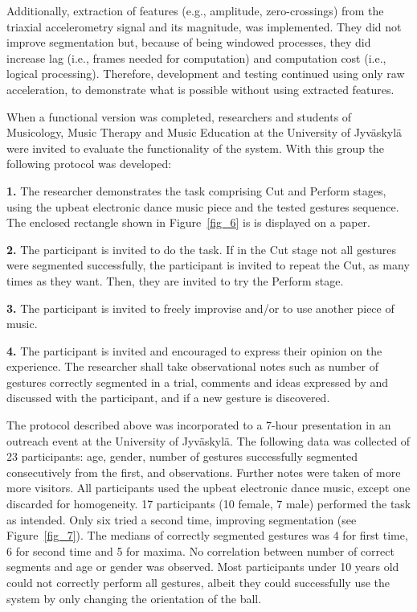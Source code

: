 \documentclass{nime-alternate_ADJ} %
\begin{document}
Additionally, extraction of features (e.g., amplitude, zero-crossings) from the triaxial accelerometry signal and its magnitude, was implemented. They did not improve segmentation but, because of being windowed processes, they did increase lag (i.e., frames needed for computation) and computation cost (i.e., logical processing). Therefore, development and testing continued using only raw acceleration, to demonstrate what is possible without using extracted features. 

When a functional version was completed, researchers and students of Musicology, Music Therapy and Music Education at the 
University of Jyväskylä
were invited to evaluate the functionality of the system. With this group the following protocol was developed:

\textbf{1.}	The researcher demonstrates the task comprising Cut and Perform stages, using the upbeat electronic dance music piece and the tested gestures sequence. The enclosed rectangle shown in Figure~\ref{fig_6} is is displayed on a paper.

\textbf{2.}	The participant is invited to do the task. If in the Cut stage not all gestures were segmented successfully, the participant is invited to repeat the Cut, as many times as they want. Then, they are invited to try the Perform stage.

\textbf{3.}	The participant is invited to freely improvise and/or to use another piece of music.

\textbf{4.}	The participant is invited and encouraged to express their opinion on the experience. The researcher shall take observational notes such as number of gestures correctly segmented in a trial, comments and ideas expressed by and discussed with the participant, and if a new gesture is discovered.

The protocol described above was incorporated to a 7-hour presentation in an outreach event at the 
University of Jyväskylä. The following data was collected of 23 participants: age, gender, number of gestures successfully segmented consecutively from the first, and observations. Further  notes were taken of more more visitors. All participants used the upbeat electronic dance music, except one  discarded for homogeneity. 17 participants (10 female, 7 male) performed the task as intended. Only six tried a second time, improving segmentation (see Figure~\ref{fig_7}). The medians of correctly segmented gestures was 4 for first time, 6 for second time and 5 for maxima. No correlation between number of correct segments and age or gender was observed. Most participants under 10 years old could not correctly perform all gestures, albeit they could successfully use the system by only changing the orientation of the ball.
\end{document}

